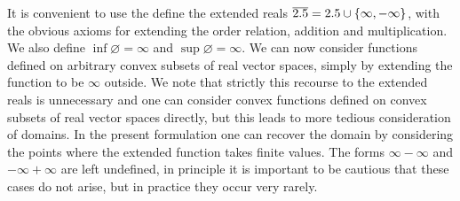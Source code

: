 It is convenient to use the define the extended reals $\overline{2.5} = 2.5 \cup \{\infty, -\infty\}$, with the obvious axioms for extending the order relation, addition and multiplication. We also define $\inf\varnothing = \infty$ and $\sup\varnothing = \infty$.
We can now consider functions defined on arbitrary convex subsets of real vector spaces, simply by extending the function to be $\infty$ outside. We note that strictly this recourse to the extended reals is unnecessary and one can consider convex functions defined on convex subsets of real vector spaces directly, but this leads to more tedious consideration of domains. In the present formulation one can recover the domain by considering the points where the extended function takes finite values. The forms $\infty-\infty$ and $-\infty +\infty$ are left undefined, in principle it is important to be cautious that these cases do not arise, but in practice they occur very rarely.

